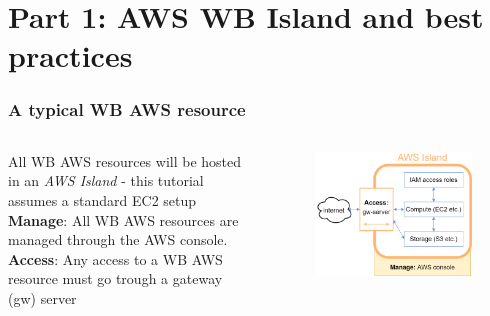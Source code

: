 \documentclass[aspectratio=169]{beamer} %
\begin{document}
\section{Part 1: AWS WB Island and best practices}

\begin{frame}
\frametitle{A typical WB AWS resource}

	\begin{columns}[c]
		\large All WB AWS resources will be hosted in an \textit{AWS Island}
		- this tutorial assumes a standard EC2 setup
		\vspace{.7cm}\newline
		\large \textbf{Manage}: All WB AWS resources are managed through the AWS console.
		\vspace{.7cm}\newline
		\large \textbf{Access}: Any access to a WB AWS resource must go trough a gateway (gw) server

		\begin{figure}
			\centering
			\includegraphics[width=\textwidth]{./img/wb-aws.png}
		\end{figure}

	\end{columns}
\end{frame}
\end{document}
